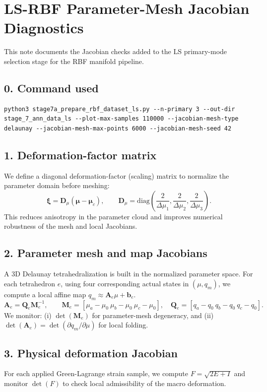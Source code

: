 \documentclass[11pt]{article}
\begin{document}
\section*{LS-RBF Parameter-Mesh Jacobian Diagnostics}
This note documents the Jacobian checks added to the LS primary-mode selection stage for the RBF manifold pipeline.
\subsection*{0. Command used}
\begin{verbatim}
python3 stage7a_prepare_rbf_dataset_ls.py --n-primary 3 --out-dir stage_7_ann_data_ls --plot-max-samples 110000 --jacobian-mesh-type delaunay --jacobian-mesh-max-points 6000 --jacobian-mesh-seed 42
\end{verbatim}
\subsection*{1. Deformation-factor matrix}
We define a diagonal deformation-factor (scaling) matrix to normalize the parameter domain before meshing:
\begin{equation}
\boldsymbol{\xi} = \mathbf{D}_{\mu}(\boldsymbol{\mu}-\boldsymbol{\mu}_c),\qquad \mathbf{D}_{\mu} = \mathrm{diag}\!\left(\frac{2}{\Delta \mu_1},\frac{2}{\Delta \mu_2},\frac{2}{\Delta \mu_3}\right).
\end{equation}
This reduces anisotropy in the parameter cloud and improves numerical robustness of the mesh and local Jacobians.
\subsection*{2. Parameter mesh and map Jacobians}
A 3D Delaunay tetrahedralization is built in the normalized parameter space. For each tetrahedron $e$, using four corresponding actual states in $(\mu,q_m)$, we compute a local affine map $q_m\approx \mathbf{A}_e\mu+\mathbf{b}_e$.
\begin{equation}
\mathbf{A}_e = \mathbf{Q}_e\mathbf{M}_e^{-1},\qquad \mathbf{M}_e=[\mu_a-\mu_0\ \mu_b-\mu_0\ \mu_c-\mu_0],\quad \mathbf{Q}_e=[q_a-q_0\ q_b-q_0\ q_c-q_0].
\end{equation}
We monitor: (i) $\det(\mathbf{M}_e)$ for parameter-mesh degeneracy, and (ii) $\det(\mathbf{A}_e)=\det(\partial q_m/\partial\mu)$ for local folding.
\subsection*{3. Physical deformation Jacobian}
For each applied Green-Lagrange strain sample, we compute $F=\sqrt{2E+I}$ and monitor $\det(F)$ to check local admissibility of the macro deformation.
\end{document}
